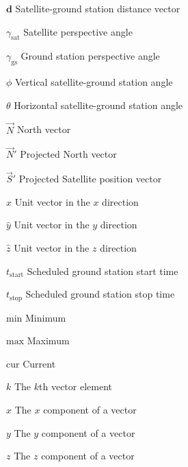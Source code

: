 \begin{Nomencl}[\gnat]
		\item[$\mathbf{d}$]						Satellite-ground station distance vector
		\item[$\gamma_{\textrm{sat}}$]	Satellite perspective angle
		\item[$\gamma_{\textrm{gs}}$]	Ground station perspective angle
		\item[$\phi$]								Vertical satellite-ground station angle
		\item[$\theta$]							Horizontal satellite-ground station angle
		\item[$\vec{N}$]							North vector
		\item[$\vec{N}'$]							Projected North vector
		\item[$\vec{S}'$]							Projected Satellite position vector
		\item[$\hat{x}$]							Unit vector in the $x$ direction
		\item[$\hat{y}$]							Unit vector in the $y$ direction
		\item[$\hat{z}$]							Unit vector in the $z$ direction

		\item[$t_\textrm{start}$]		Scheduled ground station start time
		\item[$t_\textrm{stop}$]		Scheduled ground station stop time

		\item[$\mathrm{min}$]	Minimum
		\item[$\mathrm{max}$]	Maximum
		\item[$\mathrm{cur}$]		Current
		\item[$k$]						The $k$th vector element
		\item[$x$]						The $x$ component of a vector
		\item[$y$]						The $y$ component of a vector
		\item[$z$]						The $z$ component of a vector
		

\end{Nomencl}
